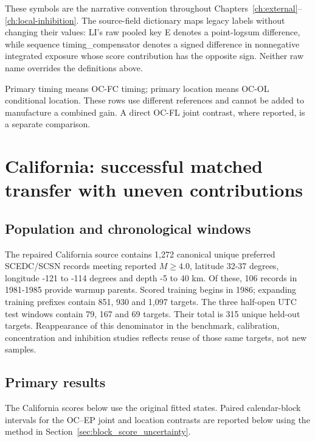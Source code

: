 These symbols are the narrative convention throughout Chapters~\ref{ch:external}--\ref{ch:local-inhibition}. The source-field dictionary maps legacy labels without changing their values: LI's raw pooled key E denotes a point-logsum difference, while sequence timing\_\allowbreak{}compensator denotes a signed difference in nonnegative integrated exposure whose score contribution has the opposite sign. Neither raw name overrides the definitions above.

Primary timing means OC-FC timing; primary location means OC-OL conditional location. These rows use different references and cannot be added to manufacture a combined gain. A direct OC-FL joint contrast, where reported, is a separate comparison.

\section{California: successful matched transfer with uneven contributions}

\subsection{Population and chronological windows}

The repaired California source contains 1,272 canonical unique preferred SCEDC/SCSN records meeting reported $M\geq 4.0$, latitude 32-37 degrees, longitude -121 to -114 degrees and depth -5 to 40 km. Of these, 106 records in 1981-1985 provide warmup parents. Scored training begins in 1986; expanding training prefixes contain 851, 930 and 1,097 targets. The three half-open UTC test windows contain 79, 167 and 69 targets. Their total is 315 unique held-out targets. Reappearance of this denominator in the benchmark, calibration, concentration and inhibition studies reflects reuse of those same targets, not new samples.

\subsection{Primary results}

The California scores below use the original fitted states. Paired calendar-block intervals for the OC--EP joint and location contrasts are reported below using the method in Section~\ref{sec:block_score_uncertainty}.


